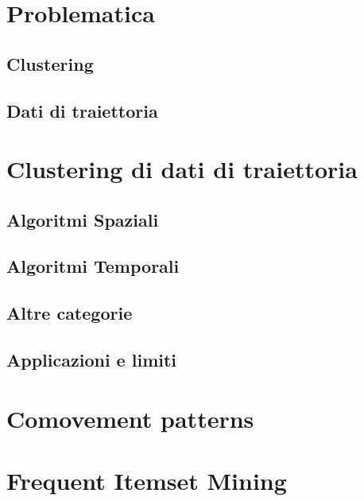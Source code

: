 
\section{Problematica}\label{sec:problem}


\subsection{Clustering}\label{subsec:problem:clustering}


\subsection{Dati di traiettoria}\label{subsec:problem:trajectorydata}


\section{Clustering di dati di traiettoria}\label{sec:problem:trajectoryclustering}


\subsection{Algoritmi Spaziali}\label{subsec:problem:spatialalgorithms}


\subsection{Algoritmi Temporali}\label{subsec:problem:temporalalgorithms}


\subsection{Altre categorie}\label{subsec:problem:othersalgorithms}


\subsection{Applicazioni e limiti}\label{subsec:problem:applicationandlimits}

\section{Comovement patterns}\label{sec:problem:comovements-pattern}

\section{Frequent Itemset Mining}\label{sec:problem:frequent-itemset-mining}

